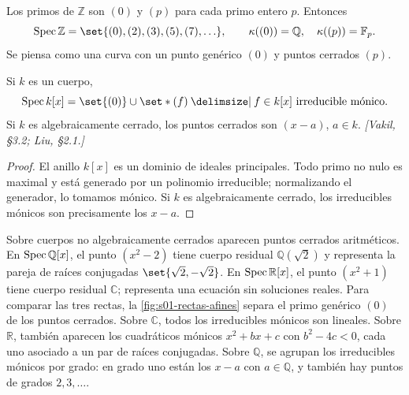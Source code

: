 \begin{ejem}
\label{ejem:s01-espectro-z}
Los primos de $\mathbb Z$ son $(0)$ y $(p)$ para cada primo entero $p$. Entonces
\[
\Spec\mathbb Z=\set{(0),(2),(3),(5),(7),\ldots},\qquad
\kappa((0))=\mathbb Q,\quad \kappa((p))=\mathbb F_p.
\]
Se piensa como una curva con un punto genérico $(0)$ y puntos cerrados $(p)$.
\end{ejem}

\begin{prop}
\label{prop:s01-recta-afin}
Si $k$ es un cuerpo,
\[
\Spec k[x]=\set{(0)}\cup\set*{(f) \given f\in k[x]\text{ irreducible mónico}}.
\]
Si $k$ es algebraicamente cerrado, los puntos cerrados son $(x-a)$, $a\in k$. \emph{[Vakil, \S3.2; Liu, \S2.1.]}
\end{prop}
\begin{proof}
El anillo $k[x]$ es un dominio de ideales principales. Todo primo no nulo es maximal y está generado por un polinomio irreducible; normalizando el generador, lo tomamos mónico. Si $k$ es algebraicamente cerrado, los irreducibles mónicos son precisamente los $x-a$.
\end{proof}

\begin{ejem}
\label{ejem:s01-recta-afin-aritmetica-q-r}
Sobre cuerpos no algebraicamente cerrados aparecen puntos cerrados aritméticos. En $\operatorname{Spec}\mathbb Q[x]$, el punto $(x^2-2)$ tiene cuerpo residual $\mathbb Q(\sqrt2)$ y representa la pareja de raíces conjugadas $\set{\sqrt2,-\sqrt2}$. En $\operatorname{Spec}\mathbb R[x]$, el punto $(x^2+1)$ tiene cuerpo residual $\mathbb C$; representa una ecuación sin soluciones reales.
Para comparar las tres rectas, la \cref{fig:s01-rectas-afines} separa el primo genérico $(0)$ de los puntos cerrados. Sobre $\mathbb C$, todos los irreducibles mónicos son lineales. Sobre $\mathbb R$, también aparecen los cuadráticos mónicos $x^2+bx+c$ con $b^2-4c<0$, cada uno asociado a un par de raíces conjugadas. Sobre $\mathbb Q$, se agrupan los irreducibles mónicos por grado: en grado uno están los $x-a$ con $a\in\mathbb Q$, y también hay puntos de grados $2,3,\ldots$.
\end{ejem}

